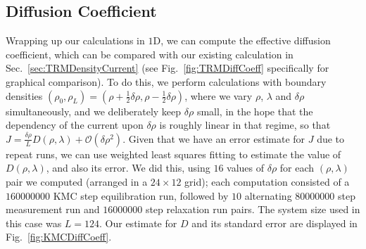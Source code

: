 \subsection{Diffusion Coefficient}
Wrapping up our calculations in $1$D, we can compute the effective diffusion coefficient, which
can be compared with our existing calculation in Sec.~\ref{sec:TRMDensityCurrent} (see 
Fig.~\ref{fig:TRMDiffCoeff} specifically for graphical comparison). To do this, we perform
calculations with boundary densities $(\rho_0, \rho_L)=(\rho + \frac{1}{2} \delta \rho , \rho -
\frac{1}{2} \delta \rho)$, where we vary $\rho$, $\lambda$ and $\delta \rho$ simultaneously, and
we deliberately keep $\delta \rho$ small, in the hope that the dependency of the current upon $\delta
\rho$ is roughly linear in that regime, so that $J = \frac{\delta \rho}{L} D(\rho, \lambda)
+ \mathcal{O}(\delta \rho^2)$. Given that we have an error estimate for $J$ due to repeat runs,
we can use weighted least squares fitting to estimate the value of $D(\rho, \lambda)$, and also
its error. We did this, using $16$ values of $\delta \rho$ for each $(\rho, \lambda)$ pair we
computed (arranged in a $24 \times 12$ grid); each computation consisted of a $160000000$ KMC step
equilibration run, followed by $10$ alternating $80000000$ step measurement run and $16000000$ step
relaxation run pairs. The system size used in this case was $L=124$. Our estimate for $D$ and its
standard error are displayed in
Fig.~\ref{fig:KMCDiffCoeff}.
